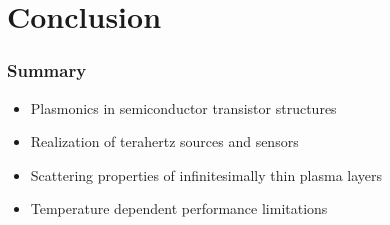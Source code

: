 \documentclass[mathserif,16pt,xcolor=table]{beamer}
\begin{document}
\section{Conclusion}
\begin{frame}
  \frametitle{Summary}
  \begin{itemize}
    \item Plasmonics in semiconductor transistor structures
    \item Realization of terahertz sources and sensors
    \item Scattering properties of infinitesimally thin plasma layers
    \item Temperature dependent performance limitations
  \end{itemize}
\end{frame}
\end{document}
